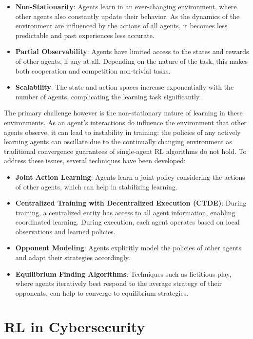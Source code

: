 \begin{itemize}
    \item \textbf{Non-Stationarity}: Agents learn in an ever-changing environment, where other agents also constantly update their behavior. As the dynamics of the environment are influenced by the actions of all agents, it becomes less predictable and past experiences less accurate.
    \item \textbf{Partial Observability}: Agents have limited access to the states and rewards of other agents, if any at all. Depending on the nature of the task, this makes both cooperation and competition non-trivial tasks.
    \item \textbf{Scalability}: The state and action spaces increase exponentially with the number of agents, complicating the learning task significantly.
\end{itemize}

The primary challenge however is the non-stationary nature of learning in these environments.
As an agent's interactions do influence the environment that other agents observe, it can lead to instability in training: the policies of any actively learning agents can oscillate due to the continually changing environment as traditional convergence guarantees of single-agent \gls{RL} algorithms do not hold.
To address these issues, several techniques have been developed:

\begin{itemize}
    \item \textbf{Joint Action Learning}: Agents learn a joint policy considering the actions of other agents, which can help in stabilizing learning.
    \item \textbf{Centralized Training with Decentralized Execution (CTDE)}: During training, a centralized entity has access to all agent information, enabling coordinated learning. During execution, each agent operates based on local observations and learned policies.
    \item \textbf{Opponent Modeling}: Agents explicitly model the policies of other agents and adapt their strategies accordingly.
    \item \textbf{Equilibrium Finding Algorithms}: Techniques such as fictitious play, where agents iteratively best respond to the average strategy of their opponents, can help to converge to equilibrium strategies.
\end{itemize}

\section{RL in Cybersecurity}

